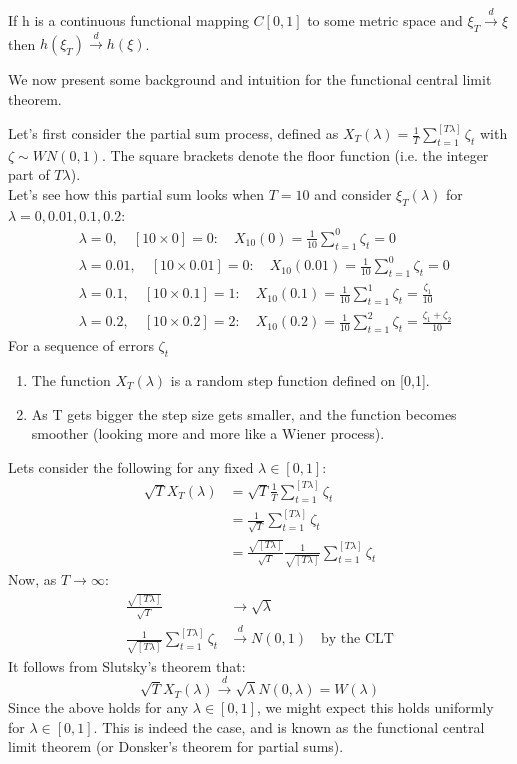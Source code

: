 \documentclass[DIV=14,titlepage=false]{scrreprt}
\begin{document}
\begin{definition}
    If h is a continuous functional mapping $C[0,1]$ to some metric space and $\xi_T \xrightarrow{d} \xi$ then $h(\xi_T) \xrightarrow{d} h(\xi)$.
\end{definition}
We now present some background and intuition for the functional central limit theorem.
\begin{explanation}
    Let's first consider the partial sum process, defined as $X_T(\lambda) = \frac{1}{T}\sum_{t=1}^{[T\lambda]} \zeta_t$ with $\zeta \sim WN (0,1)$. The square brackets denote the floor function (i.e. the integer part of $T \lambda$).\\
    Let's see how this partial sum looks when $T=10$ and consider $\xi_T(\lambda)$ for $\lambda = 0, 0.01, 0.1,0.2$:
    \begin{align*}
        &\lambda = 0, \quad [10 \times 0] =0: \quad X_{10}(0) = \frac{1}{10} \sum_{t=1}^{0} \zeta_t = 0\\
        &\lambda = 0.01, \quad [10 \times 0.01] =0: \quad  X_{10}(0.01) = \frac{1}{10} \sum_{t=1}^{0} \zeta_t = 0\\
        &\lambda = 0.1, \quad [10 \times 0.1] =1: \quad  X_{10}(0.1) = \frac{1}{10} \sum_{t=1}^{1} \zeta_t = \frac{\zeta_1}{10} \\
        &\lambda = 0.2, \quad [10 \times 0.2] =2: \quad  X_{10}(0.2) = \frac{1}{10} \sum_{t=1}^{2} \zeta_t = \frac{\zeta_1 + \zeta_2}{10}
    \end{align*}
    For a sequence of errors $\zeta_t$ 
    \begin{enumerate}
        \item The function $X_T(\lambda)$ is a random step function defined on [0,1].
        \item As T gets bigger the step size gets smaller, and the function becomes smoother (looking more and more like a Wiener process).
    \end{enumerate}
    Lets consider the following for any fixed $\lambda \in [0,1]$:
    \begin{align*}
        \sqrt{T} X_T(\lambda) &= \sqrt{T} \frac{1}{T} \sum_{t=1}^{[T\lambda]} \zeta_t\\
        &= \frac{1}{\sqrt{T}} \sum_{t=1}^{[T\lambda]} \zeta_t\\
        &= \frac{\sqrt{[T\lambda]}}{\sqrt{T}} \frac{1}{\sqrt{[T\lambda]}} \sum_{t=1}^{[T\lambda]} \zeta_t
    \end{align*}
    Now, as $T \to \infty$:
    \begin{align*}
        \frac{\sqrt{[T\lambda]}}{\sqrt{T}} &\to \sqrt{\lambda}\\
        \frac{1}{\sqrt{[T\lambda]}} \sum_{t=1}^{[T\lambda]} \zeta_t &\xrightarrow{d} N(0, 1) \quad \text{by the CLT}
    \end{align*}
    It follows from Slutsky's theorem that:
    \[
        \sqrt{T} X_T(\lambda) \xrightarrow{d} \sqrt{\lambda} N(0,\lambda) = W(\lambda)
    \]
    Since the above holds for any $\lambda \in [0,1]$, we might expect this holds uniformly for $\lambda \in [0,1]$. This is indeed the case, and is known as the functional central limit theorem (or Donsker's theorem for partial sums).
    \end{explanation}
\end{document}
